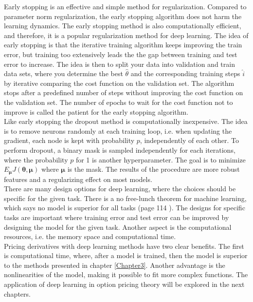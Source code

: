 Early stopping is an effective and simple method for regularization. Compared to parameter norm regularization, the early stopping algorithm does not harm the learning dynamics. The early stopping method is also computationally efficient, and therefore, it is a popular regularization method for deep learning. The idea of early stopping is that the iterative training algorithm keeps improving the train error, but training too extensively leads the the gap between training and test error to increase. The idea is then to split your data into validation and train data sets, where you determine the best $\hat{\theta}$ and the corresponding training steps $\hat{i}$ by iterative comparing the cost function on the validation set. The algorithm stops after a predefined number of steps without improving the cost function on the validation set. The number of epochs to wait for the cost function not to improve is called the patient for the early stopping algorithm.\\

Like early stopping the dropout method is computationally inexpensive. The idea is to remove neurons randomly at each training loop, i.e. when updating the gradient, each node is kept with probability $p$, independently of each other. To perform dropout, a binary mask is sampled independently for each iterations, where the probability $p$ for 1 is another hyperparameter. The goal is to minimize $E_{\bm{\mu}} J(\bm{\theta}, \bm{\mu})$ where $\bm{\mu}$ is the mask. The results of the procedure are more robust features and a regularizing effect on most models.\\

There are many design options for deep learning, where the choices should be specific for the given task. There is a no free-lunch theorem for machine learning, which says no model is superior for all tasks (page 114 \parencite{Goodfellow-et-al-2016}). The designs for specific tasks are important where training error and test error can be improved by designing the model for the given task. Another aspect is the computational resources, i.e. the memory space and computational time. \\

Pricing derivatives with deep learning methods have two clear benefits. The first is computational time, where, after a model is trained, then the model is superior to the methods presented in chapter \ref{Chapter3}. Another advantage is the nonlinearities of the model, making it possible to fit more complex functions. The application of deep learning in option pricing theory will be explored in the next chapters.

